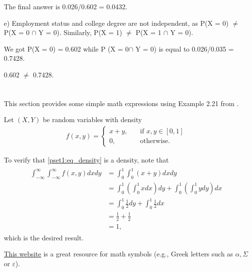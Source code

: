  The final answer is 0.026/0.602 = 0.0432.
 
 e) Employment status and college degree are not independent, as P(X = 0) $\neq$ P(X = 0 $\cap$ Y = 0).
 Similarly, P(X = 1) $\neq$ P(X = 1 $\cap$ Y = 0).
 
 We got P(X = 0) = 0.602 while P (X = 0$\cap$ Y = 0) is equal to 0.026/0.035 = 0.7428. 
 
 0.602 $\neq$ 0.7428.
 
\newpage
\section{}

This section provides some simple math expressions using Example 2.21 from \citet{wasserman2003all}.

Let $(X, Y)$ be random variables with density 
\begin{align}\label{pset1:eq_density}
    f(x, y) = \begin{cases} %
        x + y, & \quad \text{if } x, y \in [0, 1] \\
        0, & \quad \text{otherwise.}
    \end{cases}
\end{align}

To verify that \eqref{pset1:eq_density} is a density, note that
\begin{align}
    \begin{aligned} %
        \int_{-\infty}^\infty\int_{-\infty}^\infty f(x, y) dxdy & = \int_0^1\int_0^1 (x + y) dxdy \\
        & = \int_0^1\left(\int_0^1 x dx\right)dy + \int_0^1\left(\int_0^1 y dy\right)dx \\
        & = \int_0^1\frac{1}{2}dy + \int_0^1\frac{1}{2}dx \\
        & = \frac{1}{2} + \frac{1}{2}\\
        & = 1,
    \end{aligned}
\end{align}
which is the desired result.

\href{https://oeis.org/wiki/List_of_LaTeX_mathematical_symbols}{\underline{This website}} is a great resource for math symbols (e.g., Greek letters such as $\alpha, \Sigma$ or $\varepsilon$).

\newpage
\section{}

